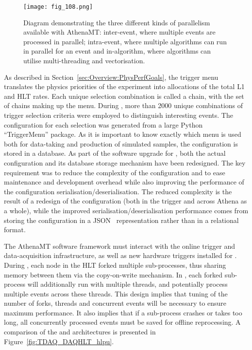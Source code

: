 \documentclass[cernpreprint, atlasdraft=false, UKenglish,british,orcidlogo, texmf, orcidlogo]{atlasdoc}
\begin{document}
\begin{figure}[htbp!]
\centerline{\texttt{[image: fig\_108.png]}}
\caption{Diagram demonstrating the three different kinds of parallelism available with \gls{AthenaMT}: inter-event, where multiple events are processed in parallel; intra-event, where multiple algorithms can run in parallel for an event and in-algorithm, where algorithms can utilise multi-threading and vectorisation.}
\label{fig:TDAQ_DAQHLT_athenamt_parallel}
\end{figure}
 
As described in Section~\ref{sec:Overview:PhysPerfGoals}, the trigger menu translates the physics priorities of the experiment into allocations of the total \gls{L1} and \gls{HLT} rates. Each unique selection combination is called a chain, with the set of chains making up the menu. During \RunTwo, more than 2000 unique combinations of trigger selection criteria were employed to distinguish interesting events.  The configuration for each selection was generated from a large 
Python ``TriggerMenu'' package. As it is important to know exactly which menu is used both for data-taking and production of simulated samples, the configuration is stored in a database.  As part of the software upgrade for \RunThr, both the actual configuration and its database storage mechanism have been redesigned. The key requirement was to reduce the complexity of the configuration and to ease maintenance and development overhead while also improving the performance of the configuration serialisation/deserialisation. The reduced complexity is the result of a redesign of the configuration (both in the trigger and across Athena as a whole), while the improved serialisation/deserialisation performance comes from storing the configuration in a JSON~\cite{JSON} representation rather than in a relational format.
 
The \gls{AthenaMT} software framework must interact with the online trigger and data-acquisition infrastructure, as well as new hardware triggers installed for \RunThr. During \RunTwo, each node in the \gls{HLT} forked multiple sub-processes, thus sharing memory between them via the copy-on-write mechanism. In \RunThr, each forked sub-process will additionally run with multiple threads, and potentially process multiple events across these threads.  This design implies that tuning of the number of forks, threads and concurrent events will be necessary to ensure maximum performance. It also implies that if a sub-process crashes or takes too long, all concurrently processed events must be saved for offline reprocessing. A comparison of the \RunTwo and \RunThr architectures is presented in Figure~\ref{fig:TDAQ_DAQHLT_hlpu}.
 
\end{document}
